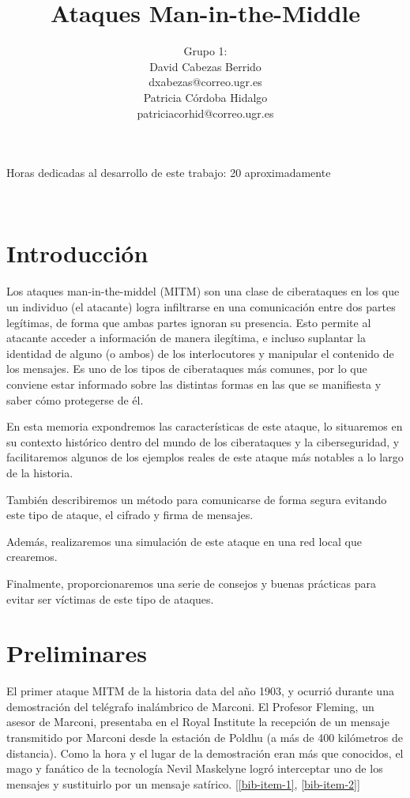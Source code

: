 \documentclass[11pt]{article}
\title{\Huge Ataques Man-in-the-Middle \vspace{10mm}}
\author{\Large Grupo 1: \vspace{10mm} \\
	\Large David Cabezas Berrido \vspace{5mm} \\ 
  \Large dxabezas@correo.ugr.es \vspace{10mm} \\
  \Large Patricia Córdoba Hidalgo \vspace{5mm} \\ 
	\Large patriciacorhid@correo.ugr.es \vspace{10mm}}
\begin{document}
\maketitle
\vfill
\begin{flushleft}
{\Large Horas dedicadas al desarrollo de este trabajo: 20 aproximadamente}
\end{flushleft}
\vspace{40mm}
~
\newpage
\tableofcontents
\newpage

\section{Introducción}

Los ataques man-in-the-middel (MITM) son una clase de ciberataques en los que un individuo (el atacante) logra infiltrarse en una
comunicación entre dos partes legítimas, de forma que ambas partes ignoran su presencia. Esto permite al atacante acceder a información
de manera ilegítima, e incluso suplantar la identidad de alguno (o ambos) de los interlocutores y manipular el contenido de los mensajes. Es uno de los tipos de ciberataques más comunes, por lo que conviene estar informado sobre las distintas formas
en las que se manifiesta y saber cómo protegerse de él.

En esta memoria expondremos las características de este ataque, lo situaremos en su contexto histórico dentro del mundo de los ciberataques y la
 ciberseguridad, y facilitaremos algunos de los ejemplos reales de este ataque más notables a lo largo de la historia.
 
 También describiremos un método para comunicarse de forma segura evitando este tipo de ataque, el cifrado y firma de mensajes.
 
Además, realizaremos una simulación de este ataque en una red local que crearemos.

Finalmente, proporcionaremos una serie de consejos y buenas prácticas para evitar ser víctimas de este tipo de ataques.

\section{Preliminares}

El primer ataque MITM de la historia data del año 1903, y ocurrió durante una demostración del telégrafo inalámbrico de Marconi.
El Profesor Fleming, un asesor de Marconi, presentaba en el Royal Institute la recepción de un mensaje transmitido por Marconi desde la estación de
 Poldhu (a más de 400 kilómetros de distancia). Como la hora y el lugar de la demostración eran más que conocidos, el mago y fanático de la
tecnología Nevil Maskelyne logró interceptar uno de los mensajes y sustituirlo por un mensaje satírico. [\ref{bib-item-1}, \ref{bib-item-2}]
\end{document}
